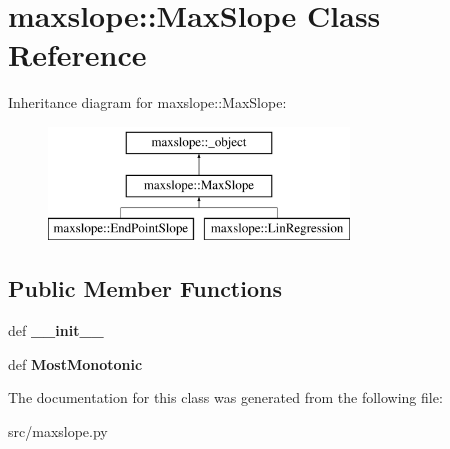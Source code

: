 \hypertarget{classmaxslope_1_1MaxSlope}{
\section{maxslope::MaxSlope Class Reference}
\label{d8/deb/classmaxslope_1_1MaxSlope}
}
Inheritance diagram for maxslope::MaxSlope:\begin{figure}[H]
\begin{center}
\leavevmode
\includegraphics[height=3cm]{d8/deb/classmaxslope_1_1MaxSlope}
\end{center}
\end{figure}
\subsection*{Public Member Functions}
\begin{DoxyCompactItemize}
\item 
\hypertarget{classmaxslope_1_1MaxSlope_a362903e9e198c5d097c7c09ae6f74dd8}{
def {\bfseries \_\-\_\-init\_\-\_\-}}
\label{d8/deb/classmaxslope_1_1MaxSlope_a362903e9e198c5d097c7c09ae6f74dd8}

\item 
\hypertarget{classmaxslope_1_1MaxSlope_a6fda530ba01a2b4bc78f7c1ad841cabf}{
def {\bfseries MostMonotonic}}
\label{d8/deb/classmaxslope_1_1MaxSlope_a6fda530ba01a2b4bc78f7c1ad841cabf}

\end{DoxyCompactItemize}


The documentation for this class was generated from the following file:\begin{DoxyCompactItemize}
\item 
src/maxslope.py\end{DoxyCompactItemize}
